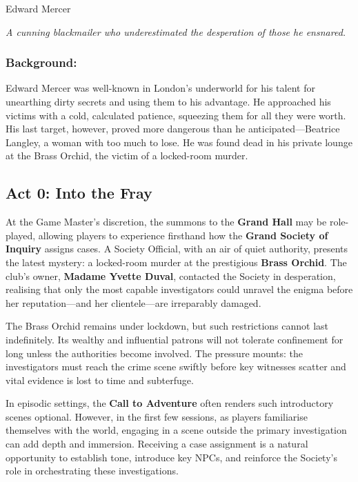 \begin{WyrdFullNPC}[%
		name=Edward Mercer,%
		description=The Murder Victim,%
		float=!t%
	]{Edward Mercer}
	
    \emph{A cunning blackmailer who underestimated the desperation of those he ensnared.}
    
    \subsubsection*{Background:}
    Edward Mercer was well-known in London’s underworld for his talent for unearthing dirty secrets and using them to his advantage. He approached his victims with a cold, calculated patience, squeezing them for all they were worth. His last target, however, proved more dangerous than he anticipated—Beatrice Langley, a woman with too much to lose. He was found dead in his private lounge at the Brass Orchid, the victim of a locked-room murder.
\end{WyrdFullNPC}

\subsection{Act 0: Into the Fray}

At the Game Master's discretion, the summons to the \textbf{Grand Hall} may be role-played, allowing players to experience firsthand how the \textbf{Grand Society of Inquiry} assigns cases. A Society Official, with an air of quiet authority, presents the latest mystery: a locked-room murder at the prestigious \textbf{Brass Orchid}. The club’s owner, \textbf{Madame Yvette Duval}, contacted the Society in desperation, realising that only the most capable investigators could unravel the enigma before her reputation—and her clientele—are irreparably damaged.

The Brass Orchid remains under lockdown, but such restrictions cannot last indefinitely. Its wealthy and influential patrons will not tolerate confinement for long unless the authorities become involved. The pressure mounts: the investigators must reach the crime scene swiftly before key witnesses scatter and vital evidence is lost to time and subterfuge.

\begin{WyrdGmTips}
	In episodic settings, the \textbf{Call to Adventure} often renders such introductory scenes optional. However, in the first few sessions, as players familiarise themselves with the world, engaging in a scene outside the primary investigation can add depth and immersion. Receiving a case assignment is a natural opportunity to establish tone, introduce key NPCs, and reinforce the Society’s role in orchestrating these investigations.
\end{WyrdGmTips}


